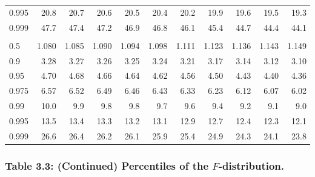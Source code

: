\documentclass[]{article}
\begin{document}
\begin{table}[H]
\begin{tabular}{lrrrrrrrrrr}
\hspace{1em}0.995 & 20.8 & 20.7 & 20.6 & 20.5 & 20.4 & 20.2 & 19.9 & 19.6 & 19.5 & 19.3\\
\hspace{1em}0.999 & 47.7 & 47.4 & 47.2 & 46.9 & 46.8 & 46.1 & 45.4 & 44.7 & 44.4 & 44.1\\
\addlinespace[0.3em]
\multicolumn{11}{l}{\textbf{$k_2=5$}}\\
\hspace{1em}0.5 & 1.080 & 1.085 & 1.090 & 1.094 & 1.098 & 1.111 & 1.123 & 1.136 & 1.143 & 1.149\\
\hspace{1em}0.9 & 3.28 & 3.27 & 3.26 & 3.25 & 3.24 & 3.21 & 3.17 & 3.14 & 3.12 & 3.10\\
\hspace{1em}0.95 & 4.70 & 4.68 & 4.66 & 4.64 & 4.62 & 4.56 & 4.50 & 4.43 & 4.40 & 4.36\\
\hspace{1em}0.975 & 6.57 & 6.52 & 6.49 & 6.46 & 6.43 & 6.33 & 6.23 & 6.12 & 6.07 & 6.02\\
\hspace{1em}0.99 & 10.0 & 9.9 & 9.8 & 9.8 & 9.7 & 9.6 & 9.4 & 9.2 & 9.1 & 9.0\\
\hspace{1em}0.995 & 13.5 & 13.4 & 13.3 & 13.2 & 13.1 & 12.9 & 12.7 & 12.4 & 12.3 & 12.1\\
\hspace{1em}0.999 & 26.6 & 26.4 & 26.2 & 26.1 & 25.9 & 25.4 & 24.9 & 24.3 & 24.1 & 23.8\\
\bottomrule
\end{tabular}
\end{table}

\hypertarget{table-3.3-continued-percentiles-of-the-f-distribution.}{%
\subsubsection{\texorpdfstring{Table 3.3: (Continued) Percentiles of the
\(F\)-distribution.}{Table 3.3: (Continued) Percentiles of the F-distribution.}}\label{table-3.3-continued-percentiles-of-the-f-distribution.}}
\end{document}

